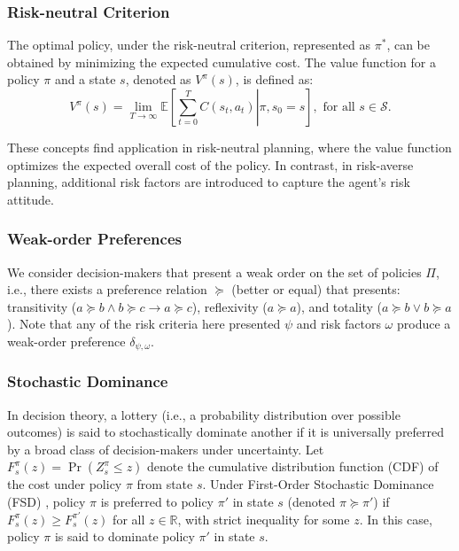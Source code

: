 \documentclass[runningheads]{llncs}
\begin{document}
\subsubsection{Risk-neutral Criterion}
The optimal policy, under the risk-neutral criterion, represented as $\pi^*$, can be obtained by minimizing the expected cumulative cost. The value function for a policy $\pi$ and a state $s$, denoted as $V^{\pi}(s)$, is defined as:
\begin{equation}
    V^\pi(s)= \lim_{T \to \infty} \mathbb{E} \left[\left.
    \sum_{t=0}^{T} C(s_{t}, a_{t}) \right| \pi, s_0 = s
    \right], \mbox{ for all } s \in \mathcal{S}.
\end{equation}

These concepts find application in risk-neutral planning, where the value function optimizes the expected overall cost of the policy. In contrast, in risk-averse planning, additional risk factors are introduced to capture the agent's risk attitude.

\subsubsection{Weak-order Preferences} We consider decision-makers that present a weak order on the set of policies $\Pi$, i.e., there exists a preference relation $\succeq$ (better or equal) that presents: transitivity ($a \succeq b \wedge b \succeq c \to a \succeq c$), reflexivity ($a \succeq a$), and totality ($a \succeq b \vee b \succeq a$). Note that any of the risk criteria here presented $\psi$ and risk factors $\omega$ produce a weak-order preference $\delta_{\psi,\omega}$.

\subsubsection{Stochastic Dominance} In decision theory, a lottery (i.e., a probability distribution over possible outcomes) is said to stochastically dominate another if it is universally preferred by a broad class of decision-makers under uncertainty. Let $F^\pi_s(z) = \Pr(Z^\pi_s \leq z)$ denote the cumulative distribution function (CDF) of the cost under policy $\pi$ from state $s$. Under First-Order Stochastic Dominance (FSD) \cite{hadar1969rules,bawa1975optimal}, policy $\pi$ is preferred to policy $\pi'$ in state $s$ (denoted $\pi \succeq \pi'$) if $F^\pi_s(z) \geq F^{\pi'}_s(z)$ for all $z \in \mathbb{R}$, with strict inequality for some $z$. In this case, policy $\pi$ is said to dominate policy $\pi'$ in state $s$.
\end{document}
